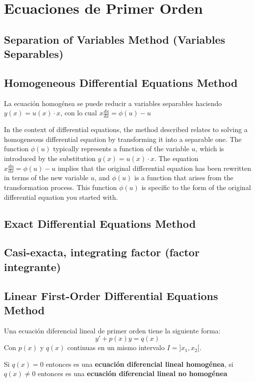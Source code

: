 \chapter{Ecuaciones de Primer Orden}
\section{Separation of Variables Method (Variables Separables)}

\section{Homogeneous Differential Equations Method}

La ecuación homogénea se puede reducir a variables separables haciendo \( y(x)=u(x) \cdot x \), con lo cual \( x \frac{d u}{d x}=\phi(u)-u \)

In the context of differential equations, the method described relates to solving a homogeneous differential equation by transforming it into a separable one. The function \( \phi(u) \) typically represents a function of the variable \( u \), which is introduced by the substitution \( y(x) = u(x) \cdot x \).
The equation \( x \frac{d u}{d x} = \phi(u) - u \) implies that the original differential equation has been rewritten in terms of the new variable \( u \), and \( \phi(u) \) is a function that arises from the transformation process. This function \( \phi(u) \) is specific to the form of the original differential equation you started with.

\section{Exact Differential Equations Method}


\section{Casi-exacta, integrating factor (factor integrante)}


\section{Linear First-Order Differential Equations Method}
Una ecuación diferencial lineal de primer orden tiene la siguiente forma:
$$y' + p(x)y = q(x)$$
Con $p(x)$ y $q(x)$ continuas en un mismo intervalo $I = ]x_1, x_2[$.

Si $q(x)=0$ entonces es una \textbf{ecuación diferencial lineal homogénea},  si $q(x)\neq0$ entonces es una \textbf{ecuación diferencial lineal no homogénea}

